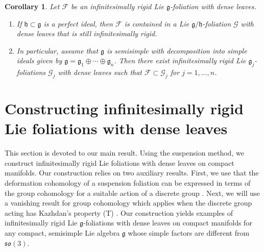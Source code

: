 \documentclass[11pt, letterpaper, oneside,reqno]{amsart}
\theoremstyle{plain}
\newtheorem{cor}[thm]{Corollary}
\theoremstyle{underline}
\theoremstyle{definition}
\theoremstyle{remark}
\begin{document}
	\begin{cor}\label{cor:semi-simple}
		Let $\mathcal{F}$ be an infinitesimally rigid Lie $\mathfrak{g}$-foliation with dense leaves. 
		\begin{enumerate}
			\item If $\mathfrak{h}\subset\mathfrak{g}$ is a perfect ideal, then $\mathcal{F}$ is contained in a Lie $\mathfrak{g}/\mathfrak{h}$-foliation $\mathcal{G}$ with dense leaves that is still infinitesimally rigid.
			\item In particular, assume that $\mathfrak{g}$ is semisimple with decomposition into simple ideals given by $\mathfrak{g}=\mathfrak{g}_1\oplus\cdots\oplus\mathfrak{g}_n$. Then there exist infinitesimally rigid Lie $\mathfrak{g}_{j}$-foliations $\mathcal{G}_j$ with dense leaves such that $\mathcal{F}\subset\mathcal{G}_{j}$ for $j=1,\ldots,n$.
		\end{enumerate}
	\end{cor}
	
	\section{Constructing infinitesimally rigid Lie foliations with dense leaves}\label{sec:five}
	This section is devoted to our main result. Using the suspension method, we construct infinitesimally rigid Lie foliations with dense leaves on compact manifolds. Our construction relies on two auxiliary results. First, we use that the deformation cohomology of a suspension foliation can be expressed in terms of the group cohomology for a suitable action of a discrete group \cite{Kacimi}. Next, we will use a vanishing result for group cohomology which applies when the discrete group acting has Kazhdan's property (T) \cite{Zimmer}. Our construction yields examples of infinitesimally rigid Lie $\mathfrak{g}$-foliations with dense leaves on compact manifolds for any compact, semisimple Lie algebra $\mathfrak{g}$ whose simple factors are different from $\mathfrak{so}(3)$. 
	
	
\end{document}

